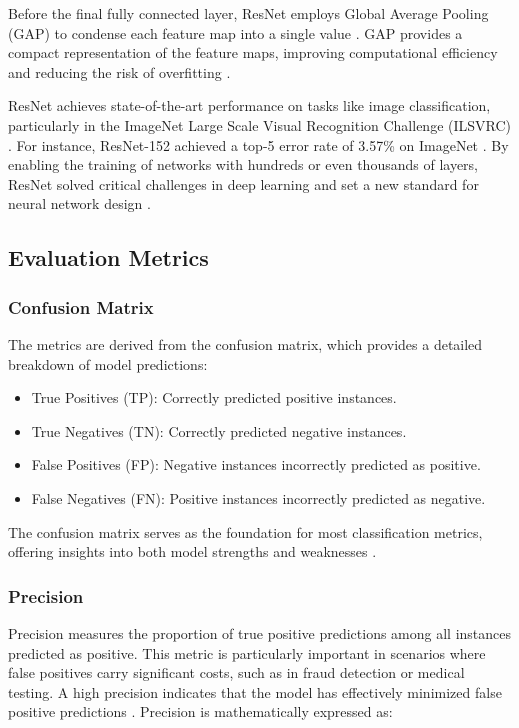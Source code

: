 Before the final fully connected layer, ResNet employs Global Average Pooling (GAP) to condense each feature map into a single value \cite{he2015deepresiduallearningimage}. GAP provides a compact representation of the feature maps, improving computational efficiency and reducing the risk of overfitting \cite{he2015deepresiduallearningimage}. 

ResNet achieves state-of-the-art performance on tasks like image classification, particularly in the ImageNet Large Scale Visual Recognition Challenge (ILSVRC) \cite{he2015deepresiduallearningimage}. For instance, ResNet-152 achieved a top-5 error rate of 3.57\% on ImageNet \cite{he2015deepresiduallearningimage}. By enabling the training of networks with hundreds or even thousands of layers, ResNet solved critical challenges in deep learning and set a new standard for neural network design \cite{he2015deepresiduallearningimage}.



\subsection{Evaluation Metrics}

\subsubsection{Confusion Matrix}
The metrics are derived from the confusion matrix, which provides a detailed breakdown of model predictions:
\begin{itemize}
    \item True Positives (TP): Correctly predicted positive instances.
    \item True Negatives (TN): Correctly predicted negative instances.
    \item False Positives (FP): Negative instances incorrectly predicted as positive.
    \item False Negatives (FN): Positive instances incorrectly predicted as negative.
\end{itemize}

The confusion matrix serves as the foundation for most classification metrics, offering insights into both model strengths and weaknesses \cite{article, dalianis2018clinical}.

\subsubsection{Precision}
Precision measures the proportion of true positive predictions among all instances predicted as positive. This metric is particularly important in scenarios where false positives carry significant costs, such as in fraud detection or medical testing. A high precision indicates that the model has effectively minimized false positive predictions \cite{article}. Precision is mathematically expressed as: 

